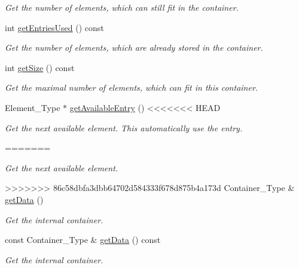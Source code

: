 \begin{DoxyCompactItemize}
\begin{DoxyCompactList}\small\item\em Get the number of elements, which can still fit in the container. \end{DoxyCompactList}\item 
int \mbox{\hyperlink{classr3_1_1_fixed_size_container_a4ec349530e78e78244f739139ed58b49}{get\+Entries\+Used}} () const
\begin{DoxyCompactList}\small\item\em Get the number of elements, which are already stored in the container. \end{DoxyCompactList}\item 
int \mbox{\hyperlink{classr3_1_1_fixed_size_container_a984b90ac15df32a41011e665e3059e17}{get\+Size}} () const
\begin{DoxyCompactList}\small\item\em Get the maximal number of elements, which can fit in this container. \end{DoxyCompactList}\item 
Element\+\_\+\+Type $\ast$ \mbox{\hyperlink{classr3_1_1_fixed_size_container_a7903fc6d43600195b97218aead60a99a}{get\+Available\+Entry}} ()
<<<<<<< HEAD
\begin{DoxyCompactList}\small\item\em Get the next available element. This automatically use the entry. \end{DoxyCompactList}\item 
=======
\begin{DoxyCompactList}\small\item\em Get the next available element. \end{DoxyCompactList}\item 
>>>>>>> 86c58dbfa3dbb64702d584333f678d875b4a173d
Container\+\_\+\+Type \& \mbox{\hyperlink{classr3_1_1_fixed_size_container_adbf383734c597677d4221278000886a3}{get\+Data}} ()
\begin{DoxyCompactList}\small\item\em Get the internal container. \end{DoxyCompactList}\item 
const Container\+\_\+\+Type \& \mbox{\hyperlink{classr3_1_1_fixed_size_container_acd837bc4730c98aa4346819726620842}{get\+Data}} () const
\begin{DoxyCompactList}\small\item\em Get the internal container. \end{DoxyCompactList}\end{DoxyCompactItemize}


